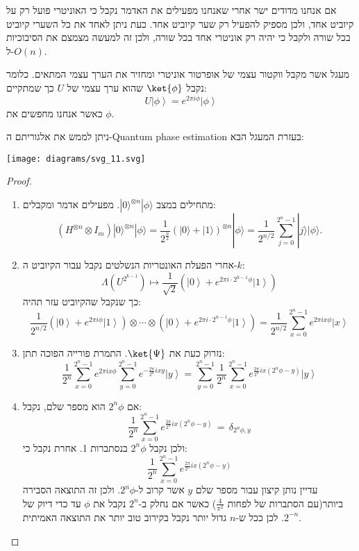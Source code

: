 \documentclass{tstextbook}
\begin{document}
\begin{proposition}
אם אנחנו מדודים ישר אחרי שאנחנו מפעילים את האדמר נקבל כי האוניטרי פועל רק על קיוביט אחד, ולכן מספיק להפעיל רק שער קיוביט אחד. כעת ניתן לאחד את כל השערי קיוביט בכל שורה ולקבל כי יהיה רק אוניטרי אחד בכל שורה, ולכן זה למעשה מצמצם את הסיבוכיות ל-\(O(n)\).

\end{proposition}
\begin{definition}
מעגל אשר מקבל ווקטור עצמי של אופרטור אוניטרי ומחזיר את הערך עצמי המתאים. כלומר נקבל \(\ket{\phi}\) שהוא ערך עצמי של \(U\) כך שמתקיים:
$$U\left|\phi\right\rangle=e^{2\pi i\phi}\left|\phi\right\rangle$$
כאשר אנחנו מחפשים את \(\phi\).

\end{definition}
\begin{proposition}
ניתן לממש את אלגוריתם ה-Quantum phase estimation בעזרת המעגל הבא:

\texttt{[image: diagrams/svg\_11.svg]}
\end{proposition}
\begin{proof}
  \begin{enumerate}
    \item מתחילים במצב \(|0\rangle^{\otimes n}|\phi\rangle\). מפעילים אדמר ומקבלים: 
$$\left( H^{\otimes n}\otimes I_{m} \right)|0\rangle^{\otimes n}|\phi\rangle=\frac{1}{2^{\frac{n}{2}}}\left( |0\rangle+|1\rangle \right)^{\otimes n}|\phi\rangle=\frac{1}{2^{n/2}}\sum_{j=0}^{2^{n}-1}|j\rangle|\phi\rangle.$$


    \item אחרי הפעלת האונטריות הנשלטים נקבל עבור הקיוביט ה-\(k\): 
$$\Lambda(U^{2^{k-1}})\mapsto {\frac{1}{\sqrt{2}}}\left(\left|0\right\rangle+e^{2\pi i\cdot2^{k-1}\phi}\left|1\right\rangle\right)$$
כך שנקבל שהקיוביט עזר תהיה:
$${\frac{1}{2^{n/2}}}\left(\left|0\right\rangle+e^{2\pi i\phi}\left|1\right\rangle\right)\otimes\cdots\otimes\left(\left|0\right\rangle+e^{2\pi i\cdot2^{n-1}\phi}\left|1\right\rangle\right)={\frac{1}{2^{n/2}}}\sum_{x=0}^{2^{n}-1}e^{2\pi i x\phi}\left|x\right\rangle$$


    \item נזרוק כעת את \(\ket{\Psi}\). התמרת פורייה הפוכה תתן: 
$${\frac{1}{2^{n}}}\sum_{x=0}^{2^{n}-1}e^{2\pi i x\phi}\sum_{y=0}^{2^{n}-1}e^{-{\frac{2\pi}{2^{n}}}i x y}\left|y\right\rangle=\sum_{y=0}^{2^{n}-1}{\frac{1}{2^{n}}}\sum_{x=0}^{2^{n}-1}e^{{\frac{2\pi}{2^{n}}}i x(2^{n}\phi-y)}\left|y\right\rangle$$


    \item אם \(2^{n}\phi\) הוא מספר שלם, נקבל: 
$$\frac{1}{2^{n}}\sum_{x=0}^{2^{n}-1}e^{\frac{2\pi}{2^{n}}i x(2^{n}\phi-y)}\,=\,\delta_{2^{n}\phi,y}$$
ולכן נקבל \(2^{n}\phi\) בנסתברות 1. אחרת נקבל כי:
$${\frac{1}{2^{n}}}\sum_{x=0}^{2^{n}-1}e^{{\frac{2\pi}{2^{n}}}i x(2^{n}\phi-y)}$$
עדיין נותן קיצון עבור מספר שלם \(y\) אשר קרוב ל-\(2^{n}\phi\). ולכן זה התוצאה הסבירה ביותר(עם הסתברות של לפחות \(\frac{4}{\pi^{2}}\)) כאשר אם נחלק ב-\(2^{n}\) נקבל את \(\phi\) עד כדי דיוק של \(2^{-n}\). לכן ככל ש-\(n\) גדול יותר נקבל בקירוב טוב יותר את התוצאה האמיתית.


  \end{enumerate}
\end{proof}
\end{document}
